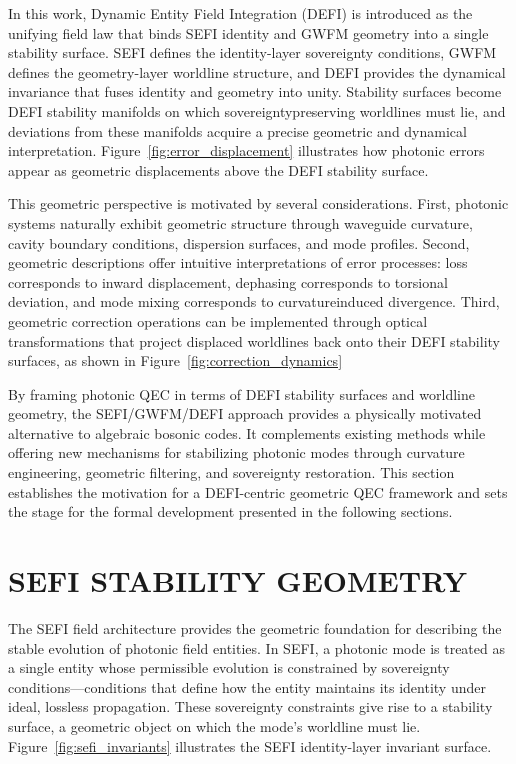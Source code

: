 \documentclass[aip,adv,reprint,floatfix]{revtex4-2}
\begin{document}
In this work, Dynamic Entity Field Integration (DEFI)
is introduced as the unifying field law that binds SEFI
identity and GWFM geometry into a single stability surface.\cite{DuttonSEFI2026,DuttonElectronField2026} SEFI defines the identity-layer sovereignty conditions, GWFM defines the geometry-layer worldline structure, and DEFI provides the dynamical invariance that
fuses identity and geometry into unity. Stability surfaces
become DEFI stability manifolds on which sovereigntypreserving worldlines must lie, and deviations from these
manifolds acquire a precise geometric and dynamical interpretation. Figure~\ref{fig:error_displacement} illustrates
how photonic errors appear as geometric displacements above
the DEFI stability surface.

This geometric perspective is motivated by several considerations. First, photonic systems naturally exhibit
geometric structure through waveguide curvature, cavity boundary conditions, dispersion surfaces, and mode
profiles.\cite{DuttonElectronField2026} Second, geometric descriptions offer intuitive
interpretations of error processes: loss corresponds to inward displacement, dephasing corresponds to torsional
deviation, and mode mixing corresponds to curvatureinduced divergence. Third, geometric correction operations can be implemented through optical transformations that project displaced worldlines back onto their
DEFI stability surfaces, as shown in Figure~\ref{fig:correction_dynamics}

By framing photonic QEC in terms of DEFI
stability surfaces and worldline geometry, the
SEFI/GWFM/DEFI approach provides a physically motivated alternative to algebraic bosonic codes.\cite{DuttonSEFI2026}
It complements existing methods while offering new
mechanisms for stabilizing photonic modes through curvature engineering, geometric filtering, and sovereignty
restoration. This section establishes the motivation
for a DEFI-centric geometric QEC framework and sets
the stage for the formal development presented in the
following sections.
\section{SEFI STABILITY GEOMETRY}

The SEFI field architecture provides the geometric
foundation for describing the stable evolution of photonic field entities.\cite{DuttonSEFI2026} In SEFI, a photonic mode is treated
as a single entity whose permissible evolution is constrained by sovereignty conditions—conditions that define how the entity maintains its identity under ideal,
lossless propagation. These sovereignty constraints give
rise to a stability surface, a geometric object on which
the mode’s worldline must lie. Figure~\ref{fig:sefi_invariants}
illustrates the SEFI identity-layer invariant surface.
\end{document}
